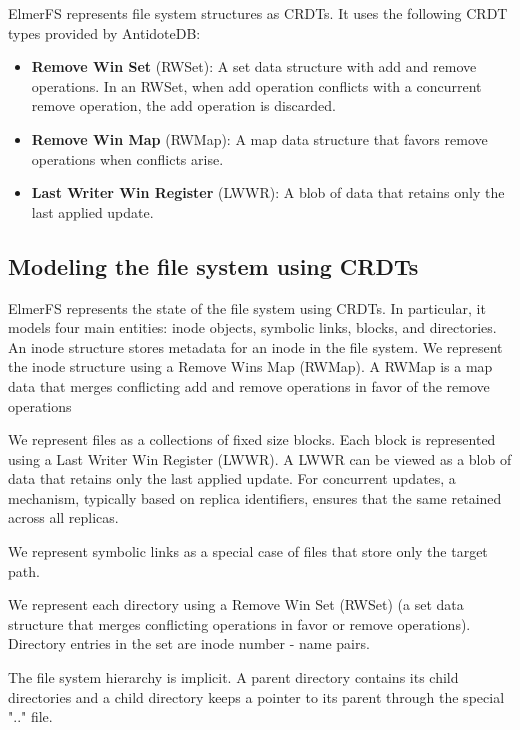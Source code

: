\documentclass[sigconf,anonymous,10pt]{acmart}
\begin{document}
ElmerFS represents file system structures as CRDTs.
It uses the following CRDT types provided by AntidoteDB:
\begin{itemize}
	\item \textbf{Remove Win Set} (RWSet): A set data structure with add and
		  remove operations.
      In an RWSet, when add operation conflicts with a concurrent remove
		  operation, the add operation is discarded.
	\item \textbf{Remove Win Map} (RWMap): A map data structure that
		  favors remove operations when conflicts arise.
	\item \textbf{Last Writer Win Register} (LWWR): A blob of data that
	retains only the last applied update.
\end{itemize}

\subsection{Modeling the file system using CRDTs}

ElmerFS represents the state of the file system using CRDTs.
In particular, it models four main entities: inode objects,
symbolic links, blocks, and directories.
An inode structure stores metadata for an inode in the file system.
We represent the inode structure using a Remove Wins Map (RWMap).
A RWMap is a map data that merges conflicting add and remove operations
in favor of the remove operations

We represent files as a collections of fixed size blocks.
Each block is represented using a Last Writer Win Register (LWWR).
A LWWR can be viewed as a blob of data that retains only the last applied update.
For concurrent updates, a mechanism, typically based on replica identifiers,
ensures that the same retained across all replicas.

We represent symbolic links as a special case of files that store only
the target path.

We represent each directory using a Remove Win Set (RWSet) (a set data structure
that merges conflicting operations in favor or remove operations).
Directory entries in the set are inode number - name pairs.

The file system hierarchy is implicit. A parent directory contains its child
directories and a child directory keeps a pointer to its parent through
the special ".." file.
\end{document}

